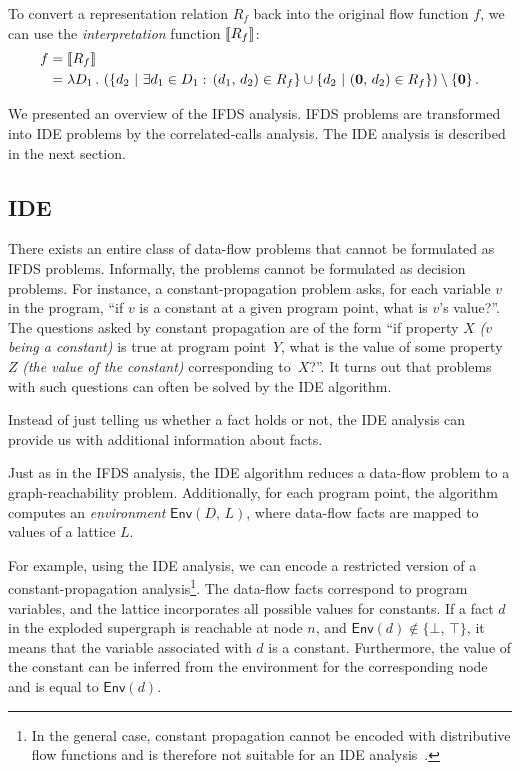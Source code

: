 \begin{mdelete}
To convert a representation relation $R_f$ back into the original flow function $f$, we can use the \textit{interpretation} function $\left\llbracket R_f\right\rrbracket$:
\begin{align}
  f&=\left\llbracket R_f\right\rrbracket\notag\\
  &=\lambda D_1\,.\,\left(\left\{d_2\ |\ \exists d_1\in D_1:\,(d_1,\,d_2)\in R_f\right\}\cup\{d_2\ |\ (\mathbf0,\,d_2)\in R_f\}\right)
  \setminus\{\mathbf0\}\,.
\end{align}
\end{mdelete}

We presented an overview of the IFDS analysis. IFDS problems are transformed into IDE problems by the correlated-calls analysis. The IDE analysis is described in the next section.

\subsection{IDE}\label{sec:bgide}
There exists an entire class of data-flow problems that cannot be formulated as IFDS problems. Informally, the problems cannot be formulated as decision problems. For instance, a constant-propagation problem asks, for each variable $v$ in the program, ``if $v$ is a constant at a given program point, what is $v$'s value?''.
The questions asked by constant propagation are of the form ``if property $X$ \textit{($v$ being a constant)} is true at program point~$Y$, what is the value of some property~$Z$ \textit{(the value of the constant)} corresponding to~$X$?''. It turns out that problems with such questions can often be solved by the IDE algorithm.

Instead of just telling us whether a fact holds or not, the IDE analysis can provide us with additional information about facts. 

Just as in the IFDS analysis, the IDE algorithm reduces a data-flow problem to a graph-reachability problem. Additionally, for each program point, the algorithm computes an \textit{environment} $\textsf{Env}(D,\,L)$, where data-flow facts are mapped to values of a lattice $L$.

For example, using the IDE analysis, we can encode a restricted version of a constant-propagation analysis\footnote{%
  In the general case, constant propagation cannot be encoded with distributive flow functions and is therefore not suitable for an IDE analysis~\cite{muller2001complexity}.
}. The data-flow facts  correspond to program variables, and the lattice incorporates all possible values for constants. 
If a fact $d$ in the exploded supergraph is reachable at node $n$, and $\textsf{Env}(d)\notin\{\bot,\,\top\}$, it means that the variable associated with $d$ is a constant. Furthermore, the value of the constant can be inferred from the environment for the corresponding node and is equal to $\textsf{Env}(d)$.

